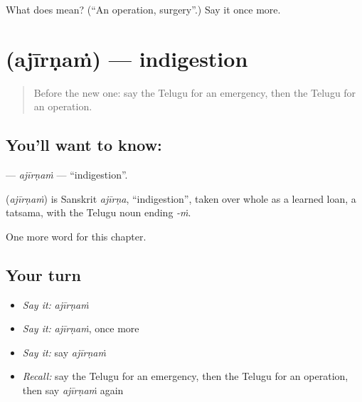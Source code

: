 \begin{tcolorbox}[breakable,colback=teal!4,colframe=teal!35!black,title={Before you move on}]
What does  mean? (\textquotedblleft{}An operation, surgery\textquotedblright{}.) Say it once more.
\end{tcolorbox}
\section[\texorpdfstring{\te{అజీర్ణం} (ajīrṇaṁ)}{అజీర్ణం (ajīrṇaṁ)}]{ (ajīrṇaṁ) — indigestion}

\label{lesson:TE-C288-ajirnam}



\begin{quote}
Before the new one: say the Telugu for an emergency, then the Telugu for an operation.
\end{quote}

\subsection*{You'll want to know: }
\textbf{} — \emph{ajīrṇaṁ} — \textquotedblleft{}indigestion\textquotedblright{}.

\begin{cousinweb}
\textbf{} (\emph{ajīrṇaṁ}) is Sanskrit \emph{ajīrṇa}, \textquotedblleft{}indigestion\textquotedblright{}, taken over whole as a learned loan, a tatsama, with the Telugu noun ending \emph{-ṁ}.
\end{cousinweb}

\begin{grammarlens}[title={What you've built}]
One more word for this chapter.
\end{grammarlens}

\subsection*{Your turn}
\begin{itemize}
\raggedright
  \item \emph{Say it:} \emph{ajīrṇaṁ}
  \item \emph{Say it:} \emph{ajīrṇaṁ}, once more
  \item \emph{Say it:} say \emph{ajīrṇaṁ}
  \item \emph{Recall:} say the Telugu for an emergency, then the Telugu for an operation, then say \emph{ajīrṇaṁ} again
\end{itemize}

